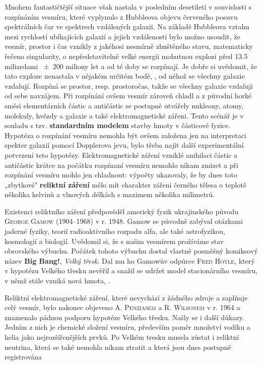         Mnohem fantastičtější situace však nastala v posledním desetiletí v souvislosti s rozpínáním
        vesmíru, které vyplynulo z Hubbleova objevu červeného posuvu spektrálních čar ve spektrech
        vzdálených galaxii. Na základě Hubbleova vztahu mezi rychlostí ubíhajících galaxií a jejich
        vzdálenosti bylo možno usoudit, že vesmír, prostor i čas vznikly z jakéhosi nesmírně
        zhuštěného stavu, matematicky řečeno singularity, o nepředstavitelně velké energii mohutnou
        explozi před \num{13.5} miliardami \num{+-200} miliony let a od té doby se rozpínají. Je
        dobře si uvědomit, že tato exploze nenastala v nějakém určitém bodě, \emph{}, od něhož se všechny galaxie vzdalují. Rozpíná se prostor, resp. prostoročas,
        takže se všechny galaxie vzdaluji od sebe navzájem. Při rozpínání ovšem vesmír zároveň
        chladl a z původní horké směsi elementárních částic a antičástic se postupně utvářely
        nukleony, atomy, molekuly, hvězdy a galaxie a také elektromagnetické zářeni. Tento scénář je
        v souladu s tzv. \textbf{standardním modelem} stavby hmoty v částicové fyzice. Hypotéza o
        rozpínání vesmíru nemohla být ovšem založena jen na interpretaci spekter galaxií pomocí
        Dopplerova jevu, bylo třeba najit další experimentální potvrzení teto hypotézy.
        Elektromagnetické záření vzniklé anihilaci částic a antičástic krátce na počátku rozpínaní
        vesmíru nemohlo nikam zmizet a při rozpínání vesmíru mohlo jen chladnout: výpočty ukazovaly,
        že by dnes toto „zbytkové" \textbf{reliktní záření} mělo mít charakter zářeni černého tělesa
        o teplotě několika kelvinů a vlnových délkách s maximem několika milimetrů. 

        Existenci reliktního záření předpověděl americký fyzik ukrajinského původu \textsc{George
        Gamow} (1904–1968) v r. 1948. Gamow se původně zabýval otázkami jaderné fyziky, teorií
        radioaktivního rozpadu alfa, ale také astrofyzikou, kosmologií a biologií. Uvědomil si, že s
        našim vesmírem prožíváme stav obrovského výbuchu. Počátek tohoto výbuchu dostal vlastně
        posměšný komiksový název \textbf{Big Bang!}, \emph{Velký třesk}. Dal mu ho Gamowův odpůrce
        \textsc{Fred Hoyle}, který v hypotézu Velkého třesku nevěřil a snažil se udržet model
        stacionárního vesmíru, v němž stále vzniká nová hmota, \emph{}.

        Reliktní elektromagnetické záření, které nevychází z žádného zdroje a zaplňuje celý vesmír,
        bylo nakonec objeveno \textsc{A. Penziasem} a \textsc{R. Wilsonem} v r. 1964 a znamenalo
        pádnou podporu hypotéze Velkého třesku. Našly se i další důkazy. Jedním z nich je chemické
        složení vesmíru, především poměr množství vodíku a helia jako nejrozšířenějších prvků. Po
        Velkém tresku musela zůstat i reliktní neutrina, která se také nemohla nikam ztratit a která
        jsou dnes postupně registrována

